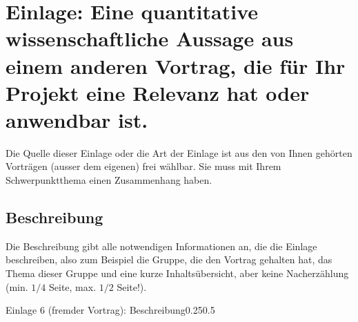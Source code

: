 
\section{Einlage: Eine quantitative wissenschaftliche Aussage aus einem anderen Vortrag, die für Ihr Projekt eine Relevanz hat oder anwendbar ist.}
\label{sec:fremdvortrag}

\begin{hinweise}
Die Quelle dieser Einlage oder die Art der Einlage ist aus den von Ihnen gehörten Vorträgen (ausser dem
eigenen) frei wählbar. Sie muss mit Ihrem Schwerpunktthema einen Zusammenhang haben.
\end{hinweise}

\subsection{Beschreibung}
\begin{hinweise}
Die Beschreibung gibt alle notwendigen Informationen an, die die Einlage beschreiben, also zum Beispiel die
Gruppe, die den Vortrag gehalten hat, das Thema dieser Gruppe und eine kurze Inhaltsübersicht, aber keine
Nacherzählung (min. $1/4$ Seite, max. $1/2$ Seite!).
\end{hinweise}
\begin{umfang}{Einlage 6 (fremder Vortrag): Beschreibung}{0.25}{0.5}
\end{umfang}

